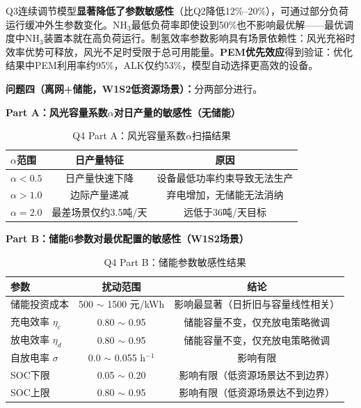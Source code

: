 \documentclass[zihao=-4,a4paper]{ctexart} %
\begin{document}
	Q3连续调节模型\textbf{显著降低了参数敏感性}（比Q2降低12\%--20\%），可通过部分负荷运行缓冲外生参数变化。NH$_3$最低负荷率即使设到50\%也不影响最优解——最优调度中NH$_3$装置本就在高负荷运行。制氢效率参数影响具有场景依赖性：风光充裕时效率优势可释放，风光不足时受限于总可用能量。\textbf{PEM优先效应}得到验证：优化结果中PEM利用率约95\%，ALK仅约53\%，模型自动选择更高效的设备。
	
	\textbf{问题四（离网+储能，W1S2低资源场景）：}分两部分进行。
	
	\textbf{Part A：风光容量系数$\alpha$对日产量的敏感性（无储能）}
	
	\begin{table}[ht]
		\centering
		\small
		\caption{Q4 Part A：风光容量系数$\alpha$扫描结果}
		\label{tab:q6_q4a}
		\begin{tabular}{lcc}
			\toprule
			$\alpha$范围 & 日产量特征 & 原因 \\
			\midrule
			$\alpha < 0.5$ & 日产量快速下降 & 设备最低功率约束导致无法生产 \\
			$\alpha > 1.0$ & 边际产量递减 & 弃电增加，无储能无法消纳 \\
			$\alpha = 2.0$ & 最差场景仅约3.5吨/天 & 远低于36吨/天目标 \\
			\bottomrule
		\end{tabular}
	\end{table}
	
	\textbf{Part B：储能6参数对最优配置的敏感性（W1S2场景）}
	
	\begin{table}[ht]
		\centering
		\small
		\caption{Q4 Part B：储能参数敏感性结果}
		\label{tab:q6_q4b}
		\begin{tabular}{lcc}
			\toprule
			参数 & 扰动范围 & 结论 \\
			\midrule
			储能投资成本 & 500 $\sim$ 1500 元/kWh & 影响最显著（日折旧与容量线性相关） \\
			充电效率 $\eta_c$ & 0.80 $\sim$ 0.95 & 储能容量不变，仅充放电策略微调 \\
			放电效率 $\eta_d$ & 0.80 $\sim$ 0.95 & 储能容量不变，仅充放电策略微调 \\
			自放电率 $\sigma$ & 0.0 $\sim$ 0.055 h$^{-1}$ & 影响有限 \\
			SOC下限 & 0.05 $\sim$ 0.20 & 影响有限（低资源场景达不到边界） \\
			SOC上限 & 0.80 $\sim$ 0.95 & 影响有限（低资源场景达不到边界） \\
			\bottomrule
		\end{tabular}
	\end{table}
	
\end{document}
